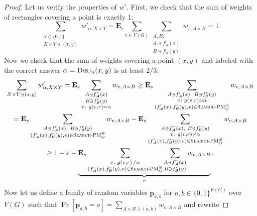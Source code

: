 \documentclass[11pt]{article}
\newcommand{\scterm}[1]{{\textrm{\sc #1}}}
\newcommand{\disj}{\scterm{Disj}}
\newcommand{\xorPM}{\textsc{Search-PM}^\oplus}
\newcommand{\Alice}{\mathcal{A}}
\newcommand{\Bob}{\mathcal{B}}
\newcommand{\E}{\mathbf{E}}
\numberwithin{equation}{section}
\begin{document}
\begin{proof}
Let us verify the properties of $w'$. First, we check that the sum of weights of rectangles covering a point is exactly 1:
\[ \sum_{\substack{\alpha \in \{0,1\}\\ X \times Y \ni (x,y)}} w'_{\alpha, X \times Y} = \E_r\sum_{v \in V(G)} \sum_{\substack{A,B\colon \\A \ni f_{\Alice}^r(x)\\[+1pt]B\ni f_{\Bob}^r(y)}} w_{v,A \times B} = 1.\]
Now we check that the sum of weights covering a point $(x,y)$ and labeled with the correct answer $\alpha = \disj_n(x,y)$ is at least $2/3$:
\begin{multline*}
    \sum_{\substack{ X \times Y \ni (x, y)}} w'_{\alpha, X \times Y} = \E_s \sum_{\substack{A \ni f_{\Alice}^r(x)\\[+1pt]B\ni f_{\Bob}^r(y) \\ v\colon g(v, r) = \alpha}} w_{v, A \times B}   
    \ge \E_s \sum_{\substack{A \ni f_{\Alice}^r(x),\ B\ni f_{\Bob}^r(y) \\ v\colon g(v, r) = \alpha \\ (f_{\Alice}^r(x), f_{\Bob}^r(y), v) \in \xorPM_G}} w_{v, A \times B}   \\
    = \E_s \sum_{\substack{A \ni f_{\Alice}^r(x),\ B\ni f_{\Bob}^r(y) \\ (f_{\Alice}^r(x), f_{\Bob}^r(y), v) \in \xorPM_G}} w_{v, A \times B}   - \E_s \sum_{\substack{A \ni f_{\Alice}^r(x),\ B\ni f_{\Bob}^r(y) \\ v\colon g(v, r) \neq \alpha \\ (f_{\Alice}^r(x), f_{\Bob}^r(y), v) \in \xorPM_G}} w_{v, A \times B}   
\\\ge
1 - \varepsilon - \underbrace{\E_s \sum_{\substack{v\colon g(v, r) \neq \alpha \\ (f_{\Alice}^r(x), f_{\Bob}^r(y),v) \in \xorPM_G}} \sum_{\substack{A \ni f_{\Alice}^r(x)\\[+1pt]B\ni f_{\Bob}^r(y)}} w_{v, A \times B}}_{r}.
\end{multline*}
Now let us define a family of random variables $\mathbf{p}_{a,b}$ for $a,b\in \{0,1\}^{E(G)}$ over $V(G)$ such that $\Pr[\mathbf{p}_{a,b} = v] = \sum_{A \times B \ni (a,b)} w_{v,A\times B}$ and rewrite

\end{proof}
\end{document}
